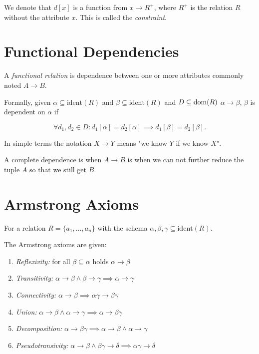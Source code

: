 We denote that \(d[x]\) is a function from \(x \to R^+\), where \(R^+\) is the relation \(R\) without the attribute \(x\).
This is called the \emph{constraint}.

\section{Functional Dependencies}

A \emph{functional relation} is dependence between one or more attributes commonly noted \(A \to B\).

Formally, given \(\alpha \subseteq \mathrm{ident}(R)\) and \(\beta \subseteq \mathrm{ident}(R)\) and \(D \subseteq \mathrm{dom}(R)\)
\(\alpha \to \beta\), \(\beta\) is dependent on \(\alpha\) if

\[
    \forall d_1, d_2 \in D: d_1[\alpha] = d_2[\alpha] \implies d_1[\beta] = d_2[\beta].
\]

In simple terms the notation \( X \to Y\) means "we know \(Y\) if we know \(X\)".

A complete dependence is when \(A \to B\) is when we can not further reduce the tuple \(A\) 
so that we still get \(B\).

\section{Armstrong Axioms}

For a relation \(R = \{a_1, \dots, a_n\}\) with the schema \(\alpha, \beta, \gamma \subseteq \mathrm{ident}(R)\).

The Armstrong axioms are given: 

\begin{enumerate}[label = \Roman*.]

    \item \emph{Reflexivity:} for all \(\beta \subseteq \alpha\) holds \(\alpha \to \beta\)

    \item \emph{Transitivity:} \(\alpha \to \beta \land \beta \to \gamma \implies \alpha \to \gamma\)

    \item \emph{Connectivity:} \(\alpha \to \beta \implies \alpha \gamma \to \beta \gamma\)

    \item \emph{Union:} \(\alpha \to \beta \land \alpha \to \gamma \implies \alpha \to \beta \gamma\)

    \item \emph{Decomposition:} \(\alpha \to \beta \gamma \implies \alpha \to \beta \land \alpha \to \gamma\)

    \item \emph{Pseudotransivity:} \(\alpha \to \beta \land \beta \gamma \to \delta \implies \alpha \gamma \to \delta\)

\end{enumerate}

